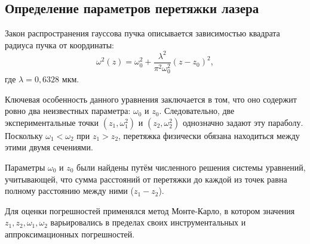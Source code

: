 \documentclass[12pt, a4paper]{article}
\begin{document}
\subsection*{Определение параметров перетяжки лазера}


Закон распространения гауссова пучка описывается зависимостью квадрата радиуса пучка от координаты:
\begin{equation}
    \omega^2(z) = \omega_0^2 + \frac{\lambda^2}{\pi^2 \omega_0^2} (z - z_0)^2,
\end{equation}
где $\lambda = 0,6328$ мкм.

Ключевая особенность данного уравнения заключается в том, что оно содержит ровно два неизвестных параметра: $\omega_0$ и $z_0$. Следовательно, две экспериментальные точки $(z_1, \omega_1^2)$ и $(z_2, \omega_2^2)$ однозначно задают эту параболу. Поскольку $\omega_1 < \omega_2$ при $z_1 > z_2$, перетяжка физически обязана находиться между этими двумя сечениями.

    Параметры $\omega_0$ и $z_0$ были найдены путём численного решения системы уравнений, учитывающей, что сумма расстояний от перетяжки до каждой из точек равна полному расстоянию между ними ($z_1 - z_2$).

Для оценки погрешностей применялся метод Монте-Карло, в котором значения $z_1, z_2, \omega_1, \omega_2$ варьировались в пределах своих инструментальных и аппроксимационных погрешностей.
\end{document}
